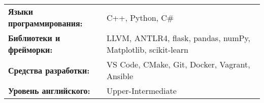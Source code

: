 \begin{tabularx}{\linewidth}{@{}l X@{}}
  \textbf{Языки программирования:} & \normalsize{C++, Python, C\#} \\
  \textbf{Библиотеки и фрейморки:}  &  \normalsize{LLVM, ANTLR4, flask, pandas, numPy, Matplotlib, scikit-learn}\\  
  \textbf{Средства разработки:}  &  \normalsize{VS Code, CMake, Git, Docker, Vagrant, Ansible}\\  
  \textbf{Уровень английского:} & \normalsize{Upper-Intermediate} \\
  \end{tabularx}